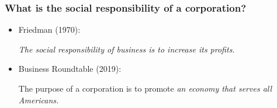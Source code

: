 \documentclass[handout]{beamer}
\begin{document}
\begin{frame}

\frametitle{What is the social responsibility of a corporation?}

\begin{itemize}[<+->]

\item Friedman (1970):

\bigskip

\textit{The social responsibility of business is to increase its profits.}

\bigskip

\item Business Roundtable (2019):

\bigskip

The purpose of a corporation is to promote \textit{an economy that serves all Americans.}

\bigskip

\end{itemize}

\end{frame}
\end{document}
